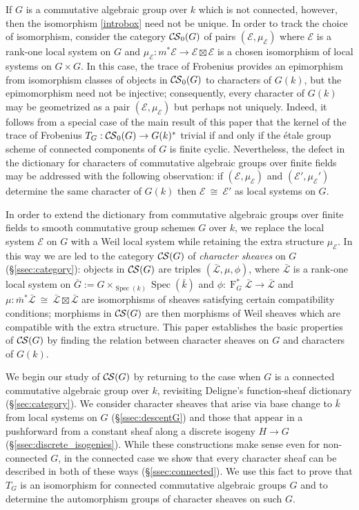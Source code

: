 \documentclass[10pt]{amsart}
\theoremstyle{plain}
\theoremstyle{definition}
\newcommand{\bFq}{\bar{k}}
\newcommand{\Fq}{k}
\newcommand{\Frob}[1]{\operatorname{F}_{#1}}
\newcommand{\Spec}[1]{{\operatorname{Spec}(#1)}}
\newcommand{\iso}{{\ \cong\ }}
\newcommand{\TrFrob}[1]{T_{#1}}
\newcommand{\cs}[1]{{\mathcal{#1}}}
\newcommand{\gcs}[1]{{\mathcal{\bar #1}}}
\newcommand{\CS}{{\mathcal{C\hskip-0.8pt S}}}
\newcommand{\bCS}{{\CS_0}}
\newcommand{\bm}{\bar{m}}
\newcommand{\bG}{\bar{G}}
\begin{document}
If $G$ is a commutative algebraic group over $\Fq$ which is not connected, however, then the isomorphism \eqref{introbox} need not be unique. In order to track the choice of isomorphism, consider the category $\bCS(G)$ of pairs $(\cs{E},\mu_\cs{E})$ where $\cs{E}$ is a rank-one local system on $G$ and $\mu_\cs{E} : m^*\cs{E} \to \cs{E}\boxtimes\cs{E}$ is a chosen isomorphism of local systems on $G\times G$. 
In this case, the trace of Frobenius provides an epimorphism from isomorphism classes of objects in $\bCS(G)$ to characters of $G(\Fq)$, but the epimomorphism need not be injective; consequently,
every character of $G(\Fq)$ may be geometrized as a pair $(\cs{E},\mu_\cs{E})$ but perhaps not uniquely.
Indeed, it follows from a special case of the main result of this paper that the kernel of the trace of Frobenius $T_{G} : \bCS(G) \to G(\Fq)^*$ trivial if and only if the \'etale group scheme of connected components of $G$ is finite cyclic.
Nevertheless, the defect in the dictionary for characters of commutative algebraic groups over finite fields may be addressed with the following observation: if $(\cs{E},\mu_\cs{E})$ and $(\cs{E}',\mu_\cs{E}')$ determine the same character of $G(\Fq)$ then $\cs{E}\iso \cs{E}'$ as local systems on $G$.


In order to extend the dictionary from commutative algebraic groups over finite fields to smooth commutative group schemes $G$ over $\Fq$,
we replace the local system $\cs{E}$ on $G$ with a Weil local system while retaining the extra structure $\mu_\cs{E}$. 
In this way we are led to the category $\CS(G)$ of {\it character sheaves} on $G$ (\S\ref{ssec:category}):
objects in $\CS(G)$ are triples $(\gcs{L}, \mu,\phi)$, where $\gcs{L}$ is a rank-one local system on $\bG := G\times_{\Spec{\Fq}} \Spec{\bFq}$
and $\phi : \Frob{G}^* \gcs{L}\to \gcs{L}$ and $\mu : \bm^* \gcs{L} \iso \gcs{L} \boxtimes \gcs{L}$ are isomorphisms of sheaves satisfying certain compatibility conditions;
morphisms in $\CS(G)$ are then morphisms of Weil sheaves which are compatible with the extra structure.
This paper establishes the basic properties of $\CS(G)$ by finding the relation between character sheaves on $G$ and characters of $G(\Fq)$.

We begin our study of $\CS(G)$ by returning to the case when $G$ is a connected commutative algebraic group over $\Fq$, revisiting Deligne's function-sheaf dictionary (\S\ref{sec:category}).
We consider character sheaves that arise via base change to $\bFq$ from local systems on $G$ (\S\ref{ssec:descentG}) and
those that appear in a pushforward from a constant sheaf along a discrete isogeny $H \to G$ (\S\ref{ssec:discrete_isogenies}).  
While these constructions make sense even for non-connected $G$, in the connected case we show that every character sheaf can be described in both of these ways (\S\ref{ssec:connected}).  
We use this fact to prove that $\TrFrob{G}$ is an isomorphism for connected commutative algebraic groups $G$
and to determine the automorphism groups of character sheaves on such $G$. 
\end{document}
